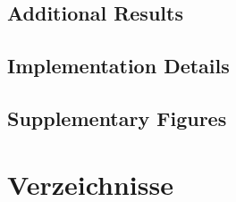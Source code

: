 \documentclass[english,bachelor]{hsluthesis}
\begin{document}

\section{Additional Results}

\section{Implementation Details}

\section{Supplementary Figures}

\chapter{Verzeichnisse}

\glsaddallunused                                %
\end{document}

